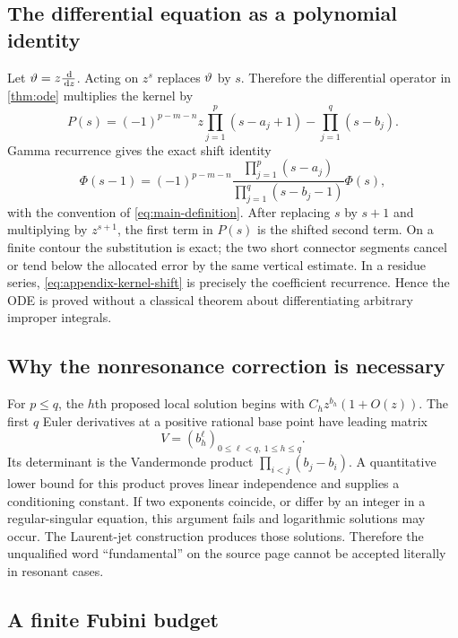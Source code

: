 \subsection{The differential equation as a polynomial identity}

Let $\vartheta=z\frac{\,\mathrm d}{\,\mathrm d z}$.  Acting on $z^s$ replaces $\vartheta$ by
$s$.  Therefore the differential operator in \cref{thm:ode} multiplies
the kernel by
\[
 P(s)=(-1)^{p-m-n}z\prod_{j=1}^{p}(s-a_j+1)
      -\prod_{j=1}^{q}(s-b_j).
\]
Gamma recurrence gives the exact shift identity
\begin{equation}\label{eq:appendix-kernel-shift}
 \Phi(s-1)=(-1)^{p-m-n}
 \frac{\prod_{j=1}^{p}(s-a_j)}
      {\prod_{j=1}^{q}(s-b_j-1)}\Phi(s),
\end{equation}
with the convention of \eqref{eq:main-definition}.  After replacing $s$ by
$s+1$ and multiplying by $z^{s+1}$, the first term in $P(s)$ is the shifted
second term.  On a finite contour the substitution is exact; the two short
connector segments cancel or tend below the allocated error by the same
vertical estimate.  In a residue series, \eqref{eq:appendix-kernel-shift} is
precisely the coefficient recurrence.  Hence the ODE is proved without a
classical theorem about differentiating arbitrary improper integrals.

\subsection{Why the nonresonance correction is necessary}

For $p\le q$, the $h$th proposed local solution begins with
$C_hz^{b_h}(1+O(z))$.  The first $q$ Euler derivatives at a positive rational
base point have leading matrix
\[
 V=(b_h^{\ell})_{0\le\ell<q,\ 1\le h\le q}.
\]
Its determinant is the Vandermonde product
$\prod_{i<j}(b_j-b_i)$.  A quantitative lower bound for this product proves
linear independence and supplies a conditioning constant.  If two exponents
coincide, or differ by an integer in a regular-singular equation, this argument
fails and logarithmic solutions may occur.  The Laurent-jet construction
produces those solutions.  Therefore the unqualified word ``fundamental'' on
the source page cannot be accepted literally in resonant cases.

\subsection{A finite Fubini budget}

